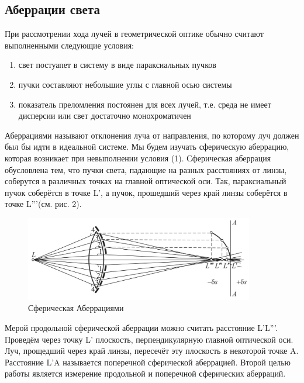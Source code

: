 \documentclass[
11pt,%
tightenlines,%
twoside,%
onecolumn,%
nofloats,%
nobibnotes,%
nofootinbib,%
superscriptaddress,%
noshowpacs,%
centertags]%
{revtex4}
\begin{document}
\subsection{Аберрации света}
При рассмотрении хода лучей в геометрической оптике обычно считают выполненными следующие условия:
\begin{enumerate}
    \item свет постуапет в систему в виде параксиальных пучков
    \item пучки составляют небольшие углы с главной осью системы
    \item показатель преломления постоянен для всех лучей, т.е. среда не имеет дисперсии или свет достаточно монохроматичен
\end{enumerate}
Аберрациями называют отклонения луча от направления, по которому луч должен был бы идти в идеальной 
системе. Мы будем изучать сферическую аберрацию, которая возникает при невыполнении условия (1).
Сферическая аберрация обусловлена тем, что пучки света, падающие на разных расстояниях от линзы,
соберутся в различных точках на главной оптической оси. Так, параксиальный пучок соберётся в точке 
L', а пучок, прошедший через край линзы соберётся в точке L'''(см. рис. 2).
\begin{figure}[h]
    \centering
    \includegraphics[width=10cm]{Spherical_aberration.jpg}
    \caption{Сферическая Аберрациями}
    \label{fig:1}
\end{figure}
Мерой продольной сферической аберрации можно считать расстояние L'L'''. Проведём через точку L' 
плоскость, перпендикулярную главной оптической оси. Луч, прощедший через край линзы, пересечёт эту
плоскость в некоторой точке A. Расстояние L'A называется поперечной сферической аберрацией. Второй
целью работы является измерение продольной и поперечной сферических аберраций. 
\end{document}
